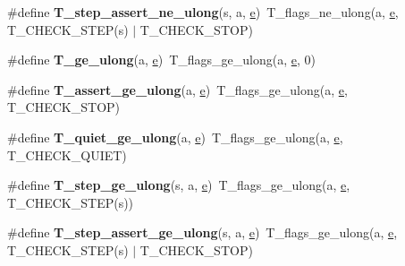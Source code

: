 \begin{DoxyCompactItemize}
\#define {\bfseries T\+\_\+step\+\_\+assert\+\_\+ne\+\_\+ulong}(s,  a,  \mbox{\hyperlink{sun4u_2tte_8h_a8b0b9ed08e0e18920ec2682f48228c27}{e}})~T\+\_\+flags\+\_\+ne\+\_\+ulong(a, \mbox{\hyperlink{sun4u_2tte_8h_a8b0b9ed08e0e18920ec2682f48228c27}{e}}, T\+\_\+\+C\+H\+E\+C\+K\+\_\+\+S\+T\+EP(s) $\vert$ T\+\_\+\+C\+H\+E\+C\+K\+\_\+\+S\+T\+OP)
\item 
\mbox{\label{group__RTEMSTestFrameworkChecksULong_ga4529a6540f2785cc5e652569c563fe9e}} 
\#define {\bfseries T\+\_\+ge\+\_\+ulong}(a,  \mbox{\hyperlink{sun4u_2tte_8h_a8b0b9ed08e0e18920ec2682f48228c27}{e}})~T\+\_\+flags\+\_\+ge\+\_\+ulong(a, \mbox{\hyperlink{sun4u_2tte_8h_a8b0b9ed08e0e18920ec2682f48228c27}{e}}, 0)
\item 
\mbox{\label{group__RTEMSTestFrameworkChecksULong_gaf319f6a7de2c38ebfccded34feb42158}} 
\#define {\bfseries T\+\_\+assert\+\_\+ge\+\_\+ulong}(a,  \mbox{\hyperlink{sun4u_2tte_8h_a8b0b9ed08e0e18920ec2682f48228c27}{e}})~T\+\_\+flags\+\_\+ge\+\_\+ulong(a, \mbox{\hyperlink{sun4u_2tte_8h_a8b0b9ed08e0e18920ec2682f48228c27}{e}}, T\+\_\+\+C\+H\+E\+C\+K\+\_\+\+S\+T\+OP)
\item 
\mbox{\label{group__RTEMSTestFrameworkChecksULong_ga6d00077969dae1145ff1577ca7983fb9}} 
\#define {\bfseries T\+\_\+quiet\+\_\+ge\+\_\+ulong}(a,  \mbox{\hyperlink{sun4u_2tte_8h_a8b0b9ed08e0e18920ec2682f48228c27}{e}})~T\+\_\+flags\+\_\+ge\+\_\+ulong(a, \mbox{\hyperlink{sun4u_2tte_8h_a8b0b9ed08e0e18920ec2682f48228c27}{e}}, T\+\_\+\+C\+H\+E\+C\+K\+\_\+\+Q\+U\+I\+ET)
\item 
\mbox{\label{group__RTEMSTestFrameworkChecksULong_ga6b0e34156d8ed05aafbfe499b14ad43a}} 
\#define {\bfseries T\+\_\+step\+\_\+ge\+\_\+ulong}(s,  a,  \mbox{\hyperlink{sun4u_2tte_8h_a8b0b9ed08e0e18920ec2682f48228c27}{e}})~T\+\_\+flags\+\_\+ge\+\_\+ulong(a, \mbox{\hyperlink{sun4u_2tte_8h_a8b0b9ed08e0e18920ec2682f48228c27}{e}}, T\+\_\+\+C\+H\+E\+C\+K\+\_\+\+S\+T\+EP(s))
\item 
\mbox{\label{group__RTEMSTestFrameworkChecksULong_ga0194c319a5f75f682a23c01ce7609cd9}} 
\#define {\bfseries T\+\_\+step\+\_\+assert\+\_\+ge\+\_\+ulong}(s,  a,  \mbox{\hyperlink{sun4u_2tte_8h_a8b0b9ed08e0e18920ec2682f48228c27}{e}})~T\+\_\+flags\+\_\+ge\+\_\+ulong(a, \mbox{\hyperlink{sun4u_2tte_8h_a8b0b9ed08e0e18920ec2682f48228c27}{e}}, T\+\_\+\+C\+H\+E\+C\+K\+\_\+\+S\+T\+EP(s) $\vert$ T\+\_\+\+C\+H\+E\+C\+K\+\_\+\+S\+T\+OP)

\end{DoxyCompactItemize}
